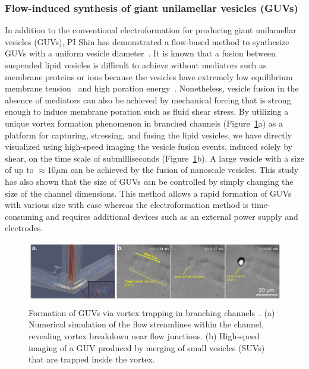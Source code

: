 \documentclass[11pt]{article}
\begin{document}
\subsubsection{Flow-induced synthesis of giant unilamellar vesicles (GUVs)\label{subsubsec:GUVs}}
In addition to the conventional electroformation for producing giant
unilamellar vesicles (GUVs), PI Shin has demonstrated a flow-based
method to synthesize GUVs with a uniform vesicle
diameter~\cite{shin2015}.  It is known that a fusion between suspended
lipid vesicles is difficult to achieve without mediators such as
membrane proteins or ions because the vesicles have extremely low
equilibrium membrane tension~\cite{jahnig1996} and high poration
energy~\cite{gao2008}.  Nonetheless, vesicle fusion in the absence of
mediators can also be achieved by mechanical forcing that is strong
enough to induce membrane poration such as fluid shear stress.  By
utilizing a unique vortex formation phenomenon in branched channels
(Figure~\ref{fig:fig4}a) as a platform for capturing, stressing, and
fusing the lipid vesicles, we have directly visualized using high-speed
imaging the vesicle fusion events, induced solely by shear, on the time
scale of submilliseconds (Figure~\ref{fig:fig4}b). A large vesicle with
a size of up to $\approx 10\mu$m can be achieved by the fusion of
nanoscale vesicles.  This study has also shown that the size of GUVs can
be controlled by simply changing the size of the channel dimensions.
This method allows a rapid formation of GUVs with various size with ease
whereas the electroformation method is time-consuming and requires
additional devices such as an external power supply and electrodes.
%
\begin{figure}[h]
\begin{center}
\includegraphics*[keepaspectratio=true,scale=1]{figs/fig4.pdf}
  \caption{\label{fig:fig4} Formation of GUVs via vortex trapping in
  branching channels~\cite{shin2015}. (a) Numerical simulation of the
  flow streamlines within the channel, revealing vortex breakdown near
  flow junctions.  (b) High-speed imaging of a GUV produced by merging
  of small vesicles (SUVs) that are trapped inside the vortex.}
\end{center}
\end{figure}
\end{document}

